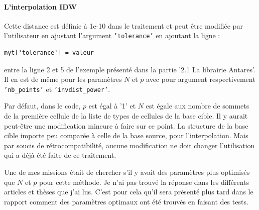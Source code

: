 \label{implementation_IDW}\paragraph{L'interpolation IDW}

Cette distance est définie à 1e-10 dans le traitement et peut être modifiée par l'utilisateur en ajustant l'argument \texttt{'tolerance'} en ajoutant la ligne :
\begin{lstlisting}[]
    myt['tolerance'] = valeur
\end{lstlisting}
entre la ligne 2 et 5 de l'exemple présenté dans la partie '2.1 La librairie Antares'.
Il en est de même pour les paramètres \(N\) et \(p\) avec pour argument respectivement \texttt{'nb\_points'} et \texttt{'invdist\_power'}.\label{parametres}

Par défaut, dans le code, \(p\) est égal à '1' et \(N\) est égale aux nombre de sommets de la première cellule de la liste de types de cellules de la base cible. Il y aurait peut-être une modification mineure à faire sur ce point. La structure de la base cible importe peu comparée à celle de la base source, pour l'interpolation. Mais par soucis de rétrocompatibilité, aucune modification ne doit changer l'utilisation qui a déjà été faite de ce traitement. %


Une de mes missions était de chercher s'il y avait des paramètres plus optimisés que \(N\) et \(p\) pour cette méthode. Je n'ai pas trouvé la réponse dans les différents articles\cite{idw-arcgis} et thèses que j'ai lus. C'est pour cela qu'il sera présenté plus tard dans le rapport comment des paramètres optimaux ont été trouvés en faisant des tests.



